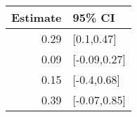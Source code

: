 \begin{tabular}{rl}
  \hline
Estimate & 95\% CI \\ 
  \hline
0.29 & [0.1,0.47] \\ 
  0.09 & [-0.09,0.27] \\ 
  0.15 & [-0.4,0.68] \\ 
  0.39 & [-0.07,0.85] \\ 
   \hline
\end{tabular}

